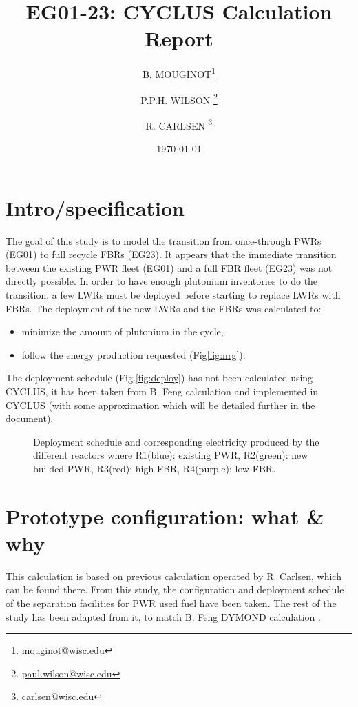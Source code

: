 \documentclass[12pt]{article}
\title{EG01-23: CYCLUS Calculation Report}
\author[1]{B. MOUGINOT\thanks{\href{mailto:mouginot@wisc.edu}{mouginot@wisc.edu}}}
\author[1]{P.P.H. WILSON \thanks{\href{mailto:paul.wilson@wisc.edu}{paul.wilson@wisc.edu}}}
\author[1]{R. CARLSEN \thanks{\href{mailto:carlsen@wisc.edu}{carlsen@wisc.edu}}}
\affil[1]{University of Wisconsin-Madison, Department of Engineering Physics, CNERG group}
\date{\today}
\begin{document}
\maketitle

\section{Intro/specification}
The goal of this study is to model the transition
from once-through PWRs (EG01) to full recycle FBRs
(EG23). It appears that the immediate transition
between the existing PWR fleet (EG01) and a full
FBR fleet (EG23) was not directly possible. In
order to have enough plutonium inventories to do
the transition, a few LWRs must be deployed before
starting to replace LWRs with FBRs. The deployment
of the new LWRs and the FBRs was calculated to:
\begin{itemize}
\item minimize the amount of plutonium in the cycle,
\item follow the energy production requested (Fig\ref{fig:nrg}).
\end{itemize}
The deployment schedule (Fig.\ref{fig:deploy}) has not been
calculated using CYCLUS, it has been taken from B.
Feng calculation and implemented in CYCLUS (with
some approximation which will be detailed further
in the document).

\begin{figure}[h!]
\centering
{}
\caption{Deployment schedule and corresponding
electricity produced by the different reactors
where R1(blue): existing PWR, R2(green): new
builded PWR, R3(red): high FBR, R4(purple): low
FBR.\label{fig:deployment} }
\end{figure}


\pagebreak
\section{Prototype configuration: what \& why}
This calculation is based on previous calculation
operated by R. Carlsen, which can be found there.
From this study, the configuration and deployment
schedule of the separation facilities for PWR used
fuel have been taken. The rest of the study has
been adapted from it, to match B. Feng DYMOND
calculation \cite{B.Feng_calculation}.
\end{document}
